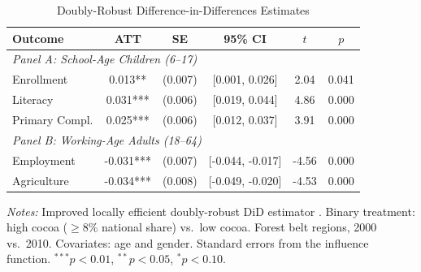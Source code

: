 \begin{table}[htbp]
\centering
\caption{Doubly-Robust Difference-in-Differences Estimates}
\label{tab:drdid}
\begin{tabular}{lccccc}
\hline\hline
Outcome & ATT & SE & 95\% CI & $t$ & $p$ \\
\hline
\multicolumn{6}{l}{\textit{Panel A: School-Age Children (6--17)}} \\
Enrollment & 0.013** & (0.007) & [0.001, 0.026] & 2.04 & 0.041 \\
Literacy & 0.031*** & (0.006) & [0.019, 0.044] & 4.86 & 0.000 \\
Primary Compl. & 0.025*** & (0.006) & [0.012, 0.037] & 3.91 & 0.000 \\
\hline
\multicolumn{6}{l}{\textit{Panel B: Working-Age Adults (18--64)}} \\
Employment & -0.031*** & (0.007) & [-0.044, -0.017] & -4.56 & 0.000 \\
Agriculture & -0.034*** & (0.008) & [-0.049, -0.020] & -4.53 & 0.000 \\
\hline\hline
\end{tabular}
\begin{minipage}{0.95\textwidth}
\vspace{0.2cm}
\footnotesize
\textit{Notes:} Improved locally efficient doubly-robust DiD estimator \citep{santanna2020}.
Binary treatment: high cocoa ($\geq$8\% national share) vs.\ low cocoa.
Forest belt regions, 2000 vs.\ 2010. Covariates: age and gender.
Standard errors from the influence function. $^{***}p<0.01$, $^{**}p<0.05$, $^{*}p<0.10$.
\end{minipage}
\end{table}
